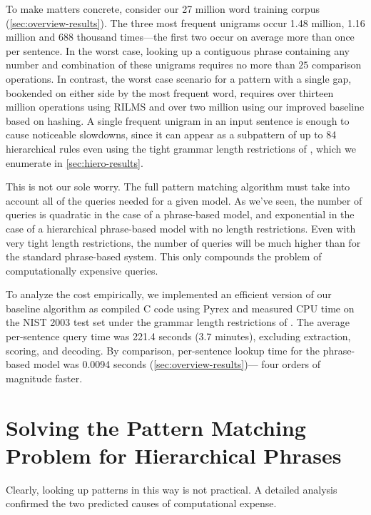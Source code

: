 To make matters concrete, consider our 27 million word training corpus 
(\textsection\ref{sec:overview-results}).  The three most frequent unigrams
occur 1.48 million, 1.16 million and 688 thousand times---the first two 
occur on average more than once per sentence.  In the worst case,
looking up a contiguous phrase containing any number and combination
of these unigrams requires no more than $25$ comparison
operations.  In contrast, the worst case scenario for a
pattern with a single gap, bookended on either side by the
most frequent word, requires over thirteen million operations using RILMS
and over two million using our improved baseline based on hashing.
A single frequent unigram in an input sentence
is enough to cause noticeable slowdowns, since
it can appear as a subpattern of up to 84 hierarchical rules even using
the tight grammar length restrictions of \citet{Chiang:2005:acl,Chiang:2007:cl},
which we enumerate in \textsection\ref{sec:hiero-results}.

This is not our sole worry.  The full pattern matching
algorithm must take into account all of the queries needed for
a given model.  As we've seen, the number of queries is quadratic in the case of
a phrase-based model, and exponential in the case of a hierarchical
phrase-based model with no length restrictions.  Even with very tight 
length restrictions, the number of 
queries will be much higher than for the standard phrase-based 
system.  This only compounds the problem of computationally
expensive queries.

To analyze the cost empirically, we implemented an efficient
version of our baseline algorithm as compiled C code using Pyrex and 
measured CPU time on the NIST 2003 test set under the grammar length restrictions
of \citet[\textsection\ref{sec:hiero-results}]{Chiang:2007:cl}.  
The average per-sentence query time
was 221.4 seconds (3.7 minutes), excluding extraction, 
scoring, and decoding.  By comparison,
per-sentence lookup time for the phrase-based model was
0.0094 seconds (\textsection\ref{sec:overview-results})---
four orders of magnitude faster.

\section{Solving the Pattern Matching Problem for Hierarchical Phrases}\label{sec:solution}

Clearly, looking up patterns in this way is not practical.
A detailed analysis confirmed the two predicted causes of 
computational expense.

